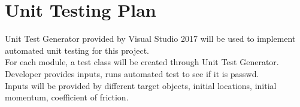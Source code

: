 \documentclass[12pt, titlepage]{article}
\begin{document}



					
					
					
					
					

					
					
					
					



				
\section{Unit Testing Plan}

Unit Test Generator provided by Visual Studio 2017 will be used to implement automated unit testing for this project.\\

For each module, a test class will be created through Unit Test Generator. Developer provides inputs, runs automated test to see if it is passwd.\\

Inputs will be provided by different target objects, initial locations, initial momentum, coefficient of friction. \\



\end{document}
